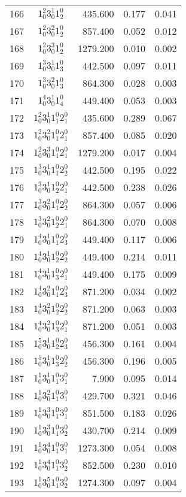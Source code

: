 \begin{table}
\begin{tabular}{rcrrr}
166&$1_0^2 3_0^1 1_2^0$& 435.600& 0.177& 0.041\\
167&$1_0^2 3_0^2 1_2^0$& 857.400& 0.052& 0.012\\
168&$1_0^2 3_0^3 1_2^0$& 1279.200& 0.010& 0.002\\
169&$1_0^3 3_0^1 1_3^0$& 442.500& 0.097& 0.011\\
170&$1_0^3 3_0^2 1_3^0$& 864.300& 0.028& 0.003\\
171&$1_0^4 3_0^1 1_4^0$& 449.400& 0.053& 0.003\\
172&$1_0^2 3_0^1 1_1^0 2_1^0$& 435.600& 0.289& 0.067\\
173&$1_0^2 3_0^2 1_1^0 2_1^0$& 857.400& 0.085& 0.020\\
174&$1_0^2 3_0^3 1_1^0 2_1^0$& 1279.200& 0.017& 0.004\\
175&$1_0^3 3_0^1 1_1^0 2_2^0$& 442.500& 0.195& 0.022\\
176&$1_0^3 3_0^1 1_2^0 2_1^0$& 442.500& 0.238& 0.026\\
177&$1_0^3 3_0^2 1_1^0 2_2^0$& 864.300& 0.057& 0.006\\
178&$1_0^3 3_0^2 1_2^0 2_1^0$& 864.300& 0.070& 0.008\\
179&$1_0^4 3_0^1 1_1^0 2_3^0$& 449.400& 0.117& 0.006\\
180&$1_0^4 3_0^1 1_2^0 2_2^0$& 449.400& 0.214& 0.011\\
181&$1_0^4 3_0^1 1_3^0 2_1^0$& 449.400& 0.175& 0.009\\
182&$1_0^4 3_0^2 1_1^0 2_3^0$& 871.200& 0.034& 0.002\\
183&$1_0^4 3_0^2 1_2^0 2_2^0$& 871.200& 0.063& 0.003\\
184&$1_0^4 3_0^2 1_3^0 2_1^0$& 871.200& 0.051& 0.003\\
185&$1_0^5 3_0^1 1_2^0 2_3^0$& 456.300& 0.161& 0.004\\
186&$1_0^5 3_0^1 1_3^0 2_2^0$& 456.300& 0.196& 0.005\\
187&$1_0^1 3_0^1 1_1^0 3_1^0$& 7.900& 0.095& 0.014\\
188&$1_0^1 3_0^2 1_1^0 3_1^0$& 429.700& 0.321& 0.046\\
189&$1_0^1 3_0^3 1_1^0 3_1^0$& 851.500& 0.183& 0.026\\
190&$1_0^1 3_0^3 1_1^0 3_2^0$& 430.700& 0.214& 0.009\\
191&$1_0^1 3_0^4 1_1^0 3_1^0$& 1273.300& 0.054& 0.008\\
192&$1_0^1 3_0^4 1_1^0 3_2^0$& 852.500& 0.230& 0.010\\
193&$1_0^1 3_0^5 1_1^0 3_2^0$& 1274.300& 0.097& 0.004\\

\end{tabular}
\end{table}
